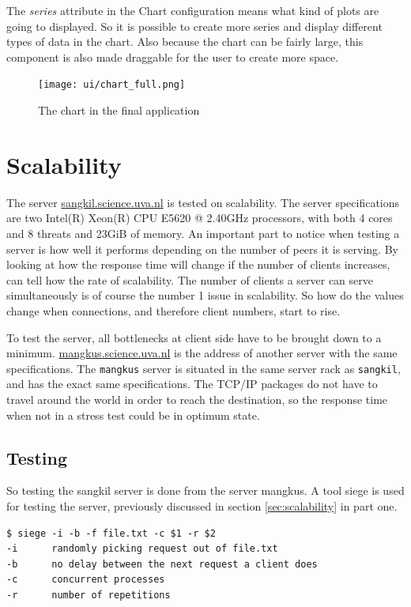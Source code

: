 The \emph{series} attribute in the Chart configuration means what kind of plots are going to displayed. So it is possible to create more series and display different types of data in the chart. Also because the chart can be fairly large, this component is also made draggable for the user to create more space.

\begin{figure}[H]
\center
\texttt{[image: ui/chart\_full.png]}
\caption{The chart in the final application}
\end{figure}

\section{Scalability}
The server \url{sangkil.science.uva.nl} is tested on scalability. The server specifications are two Intel(R) Xeon(R) CPU E5620  @ 2.40GHz processors, with both 4 cores and 8 threats and 23GiB of memory. An important part to notice when testing a server is how well it performs depending on the number of peers it is serving. By looking at how the response time will change if the number of clients increases, can tell how the rate of scalability. The number of clients a server can serve simultaneously is of course the number 1 issue in scalability. So how do the values change when connections, and therefore client numbers, start to rise.

To test the server, all bottlenecks at client side have to be brought down to a minimum. \url{mangkus.science.uva.nl} is the address of another server with the same specifications. The \texttt{mangkus} server is situated in the same server rack as \texttt{sangkil}, and has the exact same specifications. The TCP/IP packages do not have to travel around the world in order to reach the destination, so the response time when not in a stress test could be in optimum state. 

\subsection{Testing}
So testing the sangkil server is done from the server mangkus. A tool siege is used for testing the server, previously discussed in section \ref{sec:scalability} in part one.
\begin{lstlisting}
$ siege -i -b -f file.txt -c $1 -r $2
-i		randomly picking request out of file.txt
-b		no delay between the next request a client does
-c		concurrent processes
-r		number of repetitions
\end{lstlisting}

